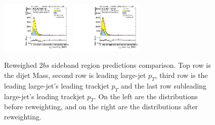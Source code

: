 \begin{figure}[htbp!]
\begin{center}
\includegraphics[width=0.31\textwidth,angle=-90]{figures/boosted/Prereweight/Moriond_TwoTag_split_Sideband_sublHCand_trk0_Pt.pdf}
\includegraphics[width=0.31\textwidth,angle=-90]{figures/boosted/Sideband/b77_TwoTag_split_Sideband_sublHCand_trk0_Pt.pdf}\\
\caption{Reweighed $2bs$ sideband region predictions comparison. Top row is the dijet Mass, second row is leading large-\R jet $p_{T}$, third row is the leading large-\R jet's leading trackjet $p_T$ and the last row subleading large-\R jet's leading trackjet $p_T$. On the left are the distributions before reweighting, and on the right are the distributions after reweighting.}
\label{fig:rw-2bs-comp-sb}
\end{center}
\end{figure}


